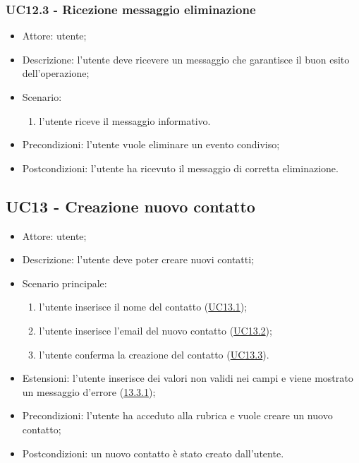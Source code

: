 \subsubsection{UC12.3 - Ricezione messaggio eliminazione} \label{sec: UC12.3}
\begin{itemize}
    \item Attore: utente;
    \item Descrizione: l'utente deve ricevere un messaggio che garantisce il buon esito dell'operazione;
    \item Scenario:
        \begin{enumerate}
        \item l'utente riceve il messaggio informativo.
        \end{enumerate}
    
    \item Precondizioni: l'utente vuole eliminare un evento condiviso;
    \item Postcondizioni: l'utente ha ricevuto il messaggio di corretta eliminazione.
\end{itemize}




\subsection{UC13 - Creazione nuovo contatto}
\begin{itemize}
    \item Attore: utente;
    \item Descrizione: l'utente deve poter creare nuovi contatti;
    \item Scenario principale:
        \begin{enumerate}
        \item l'utente inserisce il nome del contatto (\hyperref[sec: UC13.1]{UC13.1});
        \item l'utente inserisce l'email del nuovo contatto (\hyperref[sec: UC13.2]{UC13.2});
        \item l'utente conferma la creazione del contatto (\hyperref[sec: UC13.3]{UC13.3}).
        \end{enumerate}
    \item Estensioni: l'utente inserisce dei valori non validi nei campi e viene mostrato un messaggio d'errore (\hyperref[sec: UC13.3.1]{13.3.1});
    \item Precondizioni: l'utente ha acceduto alla rubrica e vuole creare un nuovo contatto;
    \item Postcondizioni: un nuovo contatto è stato creato dall'utente.
\end{itemize}



